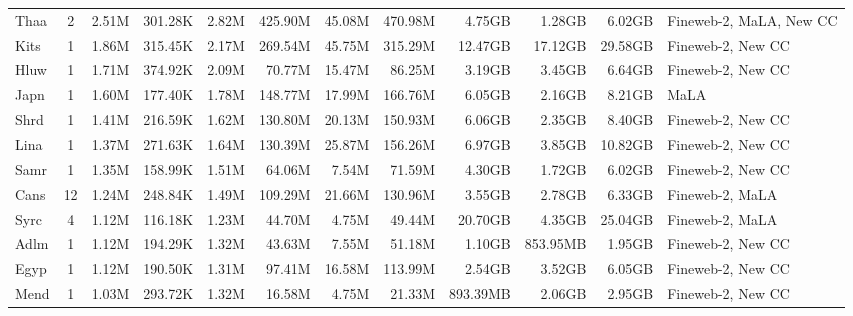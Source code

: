 \begin{table*}[!htp]
{\begin{tabular}{l|c|rrr|rrr|rrr|l}
Thaa                    & 2                        & 2.51M    & 301.28K  & 2.82M   & 425.90M & 45.08M  & 470.98M & 4.75GB   & 1.28GB   & 6.02GB   & Fineweb-2, MaLA, New CC         \\
Kits                    & 1                        & 1.86M    & 315.45K  & 2.17M   & 269.54M & 45.75M  & 315.29M & 12.47GB  & 17.12GB  & 29.58GB  & Fineweb-2, New CC              \\
Hluw                    & 1                        & 1.71M    & 374.92K  & 2.09M   & 70.77M  & 15.47M  & 86.25M  & 3.19GB   & 3.45GB   & 6.64GB   & Fineweb-2, New CC              \\
Japn                    & 1                        & 1.60M    & 177.40K  & 1.78M   & 148.77M & 17.99M  & 166.76M & 6.05GB   & 2.16GB   & 8.21GB   & MaLA                          \\
Shrd                    & 1                        & 1.41M    & 216.59K  & 1.62M   & 130.80M & 20.13M  & 150.93M & 6.06GB   & 2.35GB   & 8.40GB   & Fineweb-2, New CC              \\
Lina                    & 1                        & 1.37M    & 271.63K  & 1.64M   & 130.39M & 25.87M  & 156.26M & 6.97GB   & 3.85GB   & 10.82GB  & Fineweb-2, New CC              \\
Samr                    & 1                        & 1.35M    & 158.99K  & 1.51M   & 64.06M  & 7.54M   & 71.59M  & 4.30GB   & 1.72GB   & 6.02GB   & Fineweb-2, New CC              \\
Cans                    & 12                       & 1.24M    & 248.84K  & 1.49M   & 109.29M & 21.66M  & 130.96M & 3.55GB   & 2.78GB   & 6.33GB   & Fineweb-2, MaLA                \\
Syrc                    & 4                        & 1.12M    & 116.18K  & 1.23M   & 44.70M  & 4.75M   & 49.44M  & 20.70GB  & 4.35GB   & 25.04GB  & Fineweb-2, MaLA                \\
Adlm                    & 1                        & 1.12M    & 194.29K  & 1.32M   & 43.63M  & 7.55M   & 51.18M  & 1.10GB   & 853.95MB & 1.95GB   & Fineweb-2, New CC              \\
Egyp                    & 1                        & 1.12M    & 190.50K  & 1.31M   & 97.41M  & 16.58M  & 113.99M & 2.54GB   & 3.52GB   & 6.05GB   & Fineweb-2, New CC              \\
Mend                    & 1                        & 1.03M    & 293.72K  & 1.32M   & 16.58M  & 4.75M   & 21.33M  & 893.39MB & 2.06GB   & 2.95GB   & Fineweb-2, New CC              \\

\end{tabular}}
\end{table*}
